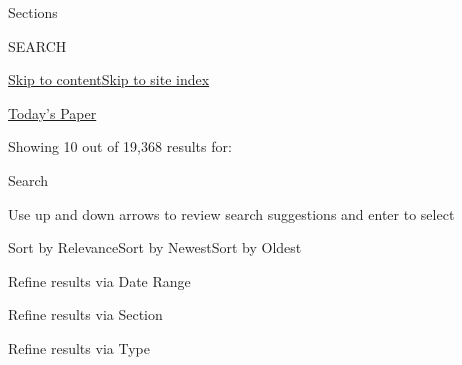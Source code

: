 Sections

SEARCH

\protect\hyperlink{site-content}{Skip to
content}\protect\hyperlink{site-index}{Skip to site index}

\href{https://myaccount.nytimes3xbfgragh.onion/auth/login?response_type=cookie\&client_id=vi}{}

\href{https://www.nytimes3xbfgragh.onion/section/todayspaper}{Today's
Paper}

Showing 10 out of 19,368 results for:

Search

Use up and down arrows to review search suggestions and enter to select

Sort by RelevanceSort by NewestSort by Oldest

Refine results via Date Range

Refine results via Section

Refine results via Type

